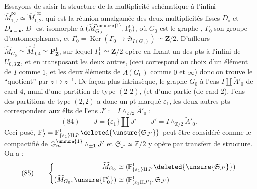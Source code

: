 Essayons de  saisir la structure de la multiplicité schématique à l'infini $\widehat M^\infty_{1,I}\simeq\widehat M^{!\,\infty}_{1,2}$, qui est la réunion amalgamée des deux multiplicités lisses  $D_\circ$ et $D_{\bullet-\bullet}$.
$D_\circ$ est isomorphe à $(\widehat M^{\unsure{!}}_{G_0},\Gamma^!_0)$, où $G_0$ est le graphe
,
$\Gamma_0$ son groupe d'automorphismes, et $\Gamma^!_0=\operatorname{Ker}(\Gamma_0\longrightarrow\mathfrak S_{I(G_0)})\simeq\mathbf Z/2$.
D'ailleurs $\widehat M_{G_0}\simeq\widehat M^!_{0,4}\simeq\mathbf P^1_{\mathbf Z}$, sur lequel $\Gamma^!_0\simeq\mathbf Z/2$ opère en fixant un des  pts à l'infini de $U_{0,3\,\mathbf Z}$,  et en transposant les deux autres,   (ceci correspond au choix d'un élément de $I$ comme $1$, et les deux éléments de $\widetilde A(G_0)$ comme $0$ et $\infty$) donc on trouve le ``quotient'' par $z\longmapsto z^{-1}$. De façon
plus intrinsèque, le graphe $G_0$   à l'ens $I\amalg\widetilde A'_0$ de card $4$, muni d'une partition de type $(2,2)$, (et \unsure{$=$} d'une partie  (de card $2$), l'ens  des  partitions de type $(2,2)$ a donc un pt marqué $\varepsilon_1$, les deux autres pts correspondent aux élts de l'ens $J':=I\wedge_{\mathbb Z/2}\widetilde A'_0$ :
\[
(84)\qquad J=\{\varepsilon_1\}\amalg J'\qquad J'=I\wedge_{\mathbb Z/2}\widetilde A'_0.
\]
Ceci posé, $\mathbb P^1_J=\mathbb P^1_{\{\varepsilon_1\}\amalg J'}\deleted{\unsure{\mathfrak S_{J'}}}$ peut être considéré comme le compactifié de $\mathbb G_m^{\unsure{1}}\wedge_{\pm1}J'$ et  $\mathfrak S_{J'}\simeq\mathbb Z/2$ y opère par transfert de structure. On a :
\[
(85)\qquad
\left\{\begin{aligned}
\widehat M_{G_0}&\simeq(\mathbb P^1_{\{\varepsilon_1\}\amalg J'}\deleted{\unsure{\mathfrak S_{J'}}})\\
(\widehat M_{G_0},\unsure{\Gamma'_0})&\simeq(\mathbb P^1_{(\varepsilon_1\amalg J')},\mathfrak S_{J'})
\end{aligned}\right.
\]
